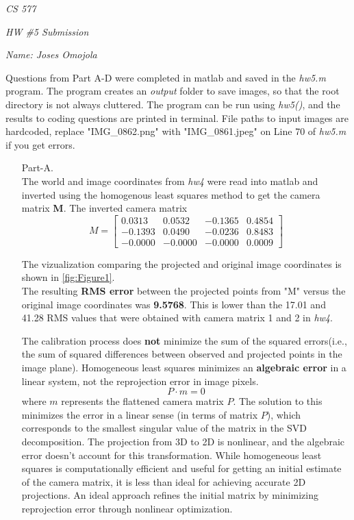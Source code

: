 \documentclass[12pt]{report}
\begin{document}
\centerline{\it CS 577}
\centerline{\it HW \#5 Submission}
\centerline{\it Name: Joses Omojola}

Questions from Part A-D were completed in matlab and saved in the \emph{hw5.m} program. The program creates an \emph{output} folder to save images, 
so that the root directory is not always cluttered. The program can be run using \textit{hw5()}, and the results to coding questions are printed in 
terminal. File paths to input images are hardcoded, replace "IMG\_0862.png" with "IMG\_0861.jpeg" on Line 70 of \emph{hw5.m} if you get errors.

\begin{enumerate}

    \item[Part-A.]
    \ \\
    The world and image coordinates from \emph{hw4} were read into matlab and inverted using the homogenous least squares method to get the camera 
    matrix \textbf{M}. The inverted camera matrix 
    \[
    M = 
    \begin{bmatrix}
    0.0313 & 0.0532 & -0.1365 & 0.4854 \\
    -0.1393 & 0.0490 & -0.0236 & 0.8483 \\
    -0.0000 & -0.0000 & -0.0000 & 0.0009
    \end{bmatrix}
    \]

    The vizualization comparing the projected and original image coordinates is shown in \autoref{fig:Figure1}.\\
    The resulting \textbf{RMS error} between the projected points from "M" versus the original image coordinates was \textbf{9.5768}. This is lower than 
    the 17.01 and 41.28 RMS values that were obtained with camera matrix 1 and 2 in \emph{hw4}.  
    
    The calibration process does \textbf{not} minimize the sum of the squared errors(i.e., the sum of squared differences between observed and projected 
    points in the image plane). Homogeneous least squares minimizes an \textbf{algebraic error} in a linear system, not the reprojection error in image pixels. 
    $$P \cdot m = 0$$
    where $m$ represents the flattened camera matrix $P$. The solution to this minimizes the error in a linear sense (in terms of matrix $P$), which 
    corresponds to the smallest singular value of the matrix in the SVD decomposition. The projection from 3D to 2D is nonlinear, and the algebraic error 
    doesn't account for this transformation. While homogeneous least squares is computationally efficient and useful for getting an initial estimate of 
    the camera matrix, it is less than ideal for achieving accurate 2D projections. An ideal approach refines the initial matrix by minimizing reprojection 
    error through nonlinear optimization.


\end{enumerate}
\end{document}
